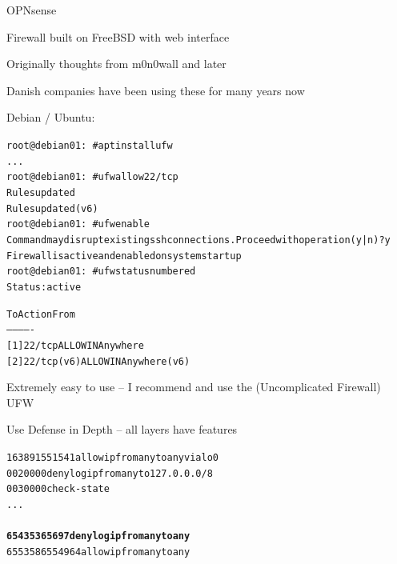 \documentclass[Screen16to9,17pt]{foils}
\begin{document}


\begin{list2}
\item OPNsense 
\item Firewall built on FreeBSD with web interface
\item Originally thoughts from m0n0wall and later \\
\item Danish companies have been using these for many years now
\end{list2}



Debian / Ubuntu:
\begin{alltt}\scriptsize
root@debian01:~# apt install ufw
...
root@debian01:~# ufw allow 22/tcp
Rules updated
Rules updated (v6)
root@debian01:~# ufw enable
Command may disrupt existing ssh connections. Proceed with operation (y|n)? y
Firewall is active and enabled on system startup
root@debian01:~# ufw status numbered
Status: active

     To                         Action      From
     --                         ------      ----
[ 1] 22/tcp                     ALLOW IN    Anywhere
[ 2] 22/tcp (v6)                ALLOW IN    Anywhere (v6)
\end{alltt}

\begin{list2}
\item Extremely easy to use -- I recommend and use the (Uncomplicated Firewall) UFW
\end{list2}





\centerline{Use Defense in Depth -- all layers have features}




\begin{alltt}
 16389  1551541 allow ip from any to any via lo0
00200     0        0 deny log ip from any to 127.0.0.0/8
00300     0        0 check-state
...
{\bfseries
65435    36     5697 deny log ip from any to any}
65535   865    54964 allow ip from any to any
\end{alltt}
\end{document}
